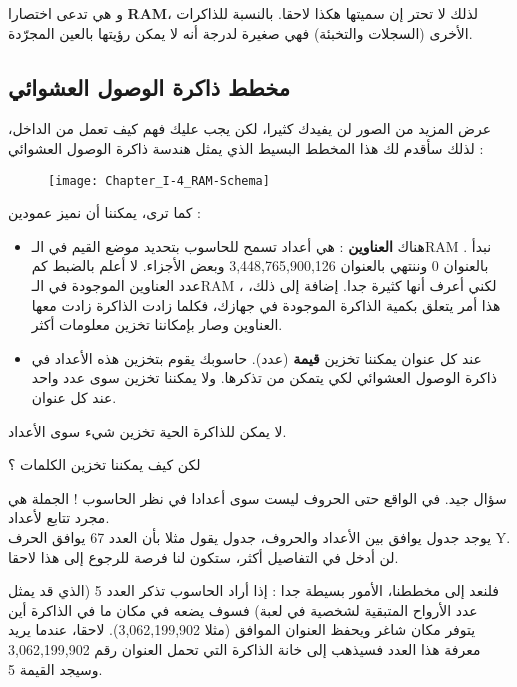 و هي تدعى اختصارا
\textbf{\textenglish{RAM}}،
لذلك لا تحتر إن سميتها هكذا لاحقا. بالنسبة للذاكرات الأخرى (السجلات والتخبئة) فهي صغيرة لدرجة أنه لا يمكن رؤيتها بالعين المجرّدة.

\subsection{مخطط ذاكرة الوصول العشوائي}

عرض المزيد من الصور لن يفيدك كثيرا، لكن يجب عليك فهم كيف تعمل من الداخل، لذلك سأقدم لك هذا المخطط البسيط الذي يمثل هندسة ذاكرة الوصول العشوائي :

\begin{figure}[H]
	\centering
	\texttt{[image: Chapter\_I-4\_RAM-Schema]}
\end{figure}


كما ترى، يمكننا أن نميز عمودين :

\begin{itemize}
  \item هناك
\textbf{العناوين}
: هي أعداد تسمح للحاسوب بتحديد موضع القيم في الـ\textenglish{RAM}
. نبدأ بالعنوان 0 وننتهي بالعنوان 3,448,765,900,126 وبعض الأجزاء. لا أعلم بالضبط كم عدد العناوين الموجودة في الـ\textenglish{RAM}
، لكني أعرف أنها كثيرة جدا. إضافة إلى ذلك، هذا أمر يتعلق بكمية الذاكرة الموجودة في جهازك، فكلما زادت الذاكرة زادت معها العناوين وصار بإمكاننا تخزين معلومات أكثر.
  \item عند كل عنوان يمكننا تخزين
\textbf{قيمة}
(عدد). حاسوبك يقوم بتخزين هذه الأعداد في ذاكرة الوصول العشوائي لكي يتمكن من تذكرها. ولا يمكننا تخزين سوى عدد واحد عند كل عنوان.
\end{itemize}

لا يمكن للذاكرة الحية تخزين شيء سوى الأعداد.

\begin{question}
  لكن كيف يمكننا تخزين الكلمات ؟
\end{question}

سؤال جيد. في الواقع حتى الحروف ليست سوى أعدادا في نظر الحاسوب ! الجملة هي مجرد تتابع لأعداد.\\
يوجد جدول يوافق بين الأعداد والحروف، جدول يقول مثلا بأن العدد 67 يوافق الحرف
\textenglish{Y}.
لن أدخل في التفاصيل أكثر، ستكون لنا فرصة للرجوع إلى هذا لاحقا.

فلنعد إلى مخططنا، الأمور بسيطة جدا : إذا أراد الحاسوب تذكر العدد 5 (الذي قد يمثل عدد الأرواح المتبقية لشخصية في لعبة) فسوف يضعه في مكان ما في الذاكرة أين يتوفر مكان شاغر ويحفظ العنوان الموافق (مثلا 3,062,199,902). لاحقا، عندما يريد معرفة هذا العدد فسيذهب إلى خانة الذاكرة التي تحمل العنوان رقم 3,062,199,902 وسيجد القيمة 5.

